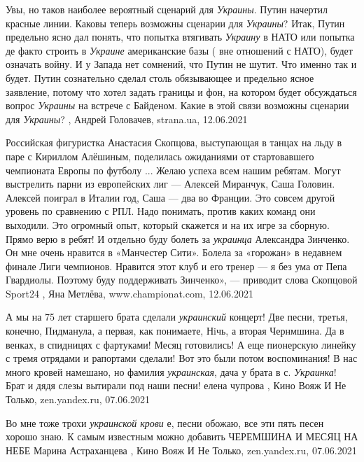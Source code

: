 Увы, но таков наиболее вероятный сценарий для \emph{Украины}.  Путин начертил красные
линии.  Каковы теперь возможны сценарии для \emph{Украины}?  Итак, Путин предельно
ясно дал понять, что попытка втягивать \emph{Украину} в НАТО или попытка де факто
строить в \emph{Украине} американские базы ( вне отношений с НАТО), будет означать
войну.  И у Запада нет сомнений, что Путин не шутит. Что именно так и будет.
Путин сознательно сделал столь обязывающее и предельно ясное заявление, потому
что хотел задать границы и фон, на котором будет обсуждаться вопрос \emph{Украины}
на встрече с Байденом. Какие в этой связи возможны сценарии для \emph{Украины}?
, Андрей Головачев, strana.ua, 12.06.2021

Российская фигуристка Анастасия Скопцова, выступающая в танцах на льду в паре с
Кириллом Алёшиным, поделилась ожиданиями от стартовавшего чемпионата Европы по
футболу ... Желаю успеха всем нашим ребятам. Могут выстрелить парни из
европейских лиг — Алексей Миранчук, Саша Головин. Алексей поиграл в Италии год,
Саша — два во Франции. Это совсем другой уровень по сравнению с РПЛ. Надо
понимать, против каких команд они выходили. Это огромный опыт, который скажется
и на их игре за сборную. Прямо верю в ребят! И отдельно буду болеть за
\emph{украинца} Александра Зинченко. Он мне очень нравится в «Манчестер Сити».
Болела за «горожан» в недавнем финале Лиги чемпионов. Нравится этот клуб и его
тренер — я без ума от Пепа Гвардиолы. Поэтому буду поддерживать Зинченко», —
приводит слова Скопцовой Sport24
, 
Яна Метлёва, www.championat.com, 12.06.2021

А мы на 75 лет старшего брата сделали \emph{украинский} концерт! Две песни,
третья, конечно, Пидманула, а первая, как понимаете, Нiчь, а вторая Чернмшина.
Да в венках, в спидницях с фартуками! Месяц готовились! А еще пионерскую
линейку с тремя отрядами и рапортами сделали! Вот это были потом воспоминания!
В нас много кровей намешано, но фамилия \emph{украинская}, дача у брата в с.
\emph{Украинка}! Брат и дядя слезы вытирали под наши песни!
елена чупрова
, 
Кино Вояж И Не Только, zen.yandex.ru, 07.06.2021

Во мне тоже трохи \emph{украинской крови} е, песни обожаю, все эти пять песен хорошо
знаю. К самым известным можно добавить ЧЕРЕМШИНА И МЕСЯЦ НА НЕБЕ
Марина Астраханцева
, 
Кино Вояж И Не Только, zen.yandex.ru, 07.06.2021

